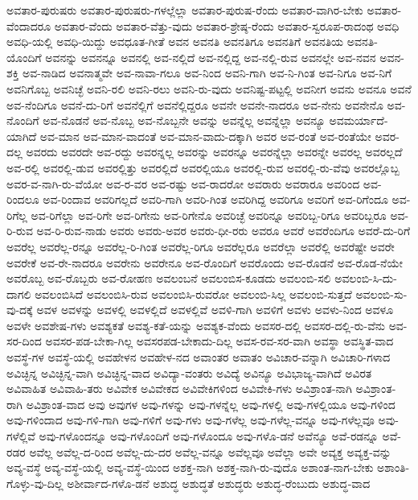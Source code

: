 {ಅವತಾರ-ಪುರುಷರು
ಅವತಾರ-ಪುರುಷರು-ಗಳಲ್ಲೆಲ್ಲಾ
ಅವತಾರ-ಪುರುಷ-ರೆಂದು
ಅವತಾರ-ವಾಗಿರ-ಬೇಕು
ಅವತಾರ-ವೆಂದಾದರೂ
ಅವತಾರ-ವೆಂದು
ಅವತಾರ-ವೆತ್ತು-ವುದು
ಅವತಾರ-ಶ್ರೇಷ್ಠ-ರೆಂದು
ಅವತಾರ-ಸ್ವರೂಪ-ರಾದಂಥ
ಅವಧಿ
ಅವಧಿ-ಯಲ್ಲಿ
ಅವಧಿ-ಯಿದ್ದು
ಅವಧೂತ-ಗೀತೆ
ಅವನ
ಅವನತಿ
ಅವನತಿಗೂ
ಅವನತಿಗೆ
ಅವನತಿಯ
ಅವನತಿ-ಯೊಂದಿಗೆ
ಅವನನ್ನು
ಅವನನ್ನೂ
ಅವನಲ್ಲಿ
ಅವ-ನಲ್ಲಿದೆ
ಅವ-ನಲ್ಲಿದ್ದ
ಅವ-ನಲ್ಲಿ-ರುವ
ಅವನಲ್ಲೇ
ಅವ-ನವನ
ಅವನ-ಶಕ್ತಿ
ಅವ-ನಾಡಿದ
ಅವನಾತ್ಮವೇ
ಅವ-ನಾವಾ-ಗಲೂ
ಅವ-ನಿಂದ
ಅವನಿ-ಗಾಗಿ
ಅವ-ನಿ-ಗಿಂತ
ಅವ-ನಿಗೂ
ಅವ-ನಿಗೆ
ಅವನಿಗೊಬ್ಬ
ಅವನಿಚ್ಛೆ
ಅವನಿ-ರಲಿ
ಅವನಿ-ರಲು
ಅವನಿ-ರು-ವುದು
ಅವನಿಷ್ಟ-ಪಟ್ಟಲ್ಲಿ
ಅವನೀಗ
ಅವನು
ಅವನೂ
ಅವನೆ
ಅವ-ನೆಂದಿಗೂ
ಅವನೆ-ದು-ರಿಗೆ
ಅವನೆಲ್ಲಿಗೆ
ಅವನೆಲ್ಲಿದ್ದರೂ
ಅವನೇ
ಅವನೇ-ನಾದರೂ
ಅವ-ನೇನು
ಅವನೇನೊ
ಅವ-ನೊಂದಿಗೆ
ಅವ-ನೊಡನೆ
ಅವ-ನೊಬ್ಬ
ಅವ-ನೊಬ್ಬನೇ
ಅವನ್ನು
ಅವನ್ನೆಲ್ಲ
ಅವನ್ನೆಲ್ಲಾ
ಅವನ್ಯೂ
ಅವಮರ್ಯಾದೆ-ಯಾಗಿದೆ
ಅವ-ಮಾನ
ಅವ-ಮಾನ-ವಾದಂತೆ
ಅವ-ಮಾನ-ವಾದು-ದಕ್ಕಾಗಿ
ಅವರ
ಅವ-ರಂತೆ
ಅವ-ರಂತೆಯೇ
ಅವರ-ದಲ್ಲ
ಅವರದು
ಅವರದೇ
ಅವ-ರದ್ದು
ಅವರನ್ನಲ್ಲ
ಅವರನ್ನು
ಅವರನ್ನೂ
ಅವರನ್ನೆಲ್ಲಾ
ಅವರನ್ನೇ
ಅವರಲ್ಲ
ಅವರಲ್ಲದೆ
ಅವ-ರಲ್ಲಿ
ಅವರಲ್ಲಿ-ಡುವ
ಅವರಲ್ಲಿತ್ತು
ಅವರಲ್ಲಿದೆ
ಅವರಲ್ಲಿಯೂ
ಅವರಲ್ಲಿ-ರುವ
ಅವರಲ್ಲಿ-ರು-ವೆವು
ಅವರಲ್ಲೊಬ್ಬ
ಅವರ-ವ-ನಾಗಿ-ರು-ವೆಯೋ
ಅವ-ರ-ವರ
ಅವ-ರಷ್ಟು
ಅವ-ರಾದರೋ
ಅವರಾರು
ಅವರಾರೂ
ಅವರಿಂದ
ಅವ-ರಿಂದಲೂ
ಅವ-ರಿಂದಾವ
ಅವರಿಗಲ್ಲದೆ
ಅವರಿ-ಗಾಗಿ
ಅವರಿ-ಗಿಂತ
ಅವರಿಗಿದ್ದ
ಅವರಿಗೂ
ಅವರಿಗೆ
ಅವ-ರಿಗೆಂದೂ
ಅವ-ರಿಗೆಲ್ಲ
ಅವ-ರಿಗೆಲ್ಲಾ
ಅವ-ರಿಗೇ
ಅವ-ರಿಗೇನು
ಅವ-ರಿಗೇನೊ
ಅವರಿಚ್ಛೆ
ಅವರಿನ್ನೂ
ಅವರಿಬ್ಬ-ರಿಗೂ
ಅವರಿಬ್ಬರೂ
ಅವ-ರಿ-ರುವ
ಅವ-ರಿ-ರುವ-ನಾಡು
ಅವರು
ಅವರು-ಅವರ
ಅವರು-ಧೀ-ರರು
ಅವರೂ
ಅವರೆ
ಅವರೆಂದಿಗೂ
ಅವರೆ-ದು-ರಿಗೆ
ಅವರೆಲ್ಲ
ಅವರೆಲ್ಲ-ರನ್ನೂ
ಅವರೆಲ್ಲ-ರಿ-ಗಿಂತ
ಅವರೆಲ್ಲ-ರಿಗೂ
ಅವರೆಲ್ಲರೂ
ಅವರೆಲ್ಲಾ
ಅವರೆಲ್ಲಿ
ಅವರೆಷ್ಟೇ
ಅವರೇ
ಅವರೇಕೆ
ಅವ-ರೇ-ನಾದರೂ
ಅವರೇನು
ಅವರೇನೂ
ಅವ-ರೊಂದಿಗೆ
ಅವರೊಂದು
ಅವ-ರೊಡನೆ
ಅವ-ರೊಡ-ನೆಯೇ
ಅವರೊಬ್ಬ
ಅವ-ರೊಬ್ಬರು
ಅವ-ರೋಹಣ
ಅವಲಂಬನೆ
ಅವಲಂಬಿಸ-ಕೂಡದು
ಅವಲಂಬಿ-ಸಲಿ
ಅವಲಂಬಿ-ಸಿ-ದು-ದಾಗಲಿ
ಅವಲಂಬಿಸಿದೆ
ಅವಲಂಬಿಸಿ-ರುವ
ಅವಲಂಬಿಸಿ-ರುವರೋ
ಅವಲಂಬಿ-ಸಿಲ್ಲ
ಅವಲಂಬಿ-ಸುತ್ತದೆ
ಅವಲಂಬಿ-ಸು-ವು-ದಕ್ಕೆ
ಅವಳ
ಅವಳನ್ನು
ಅವಳಲ್ಲಿ
ಅವಳಲ್ಲಿದೆ
ಅವಳಲ್ಲಿವೆ
ಅವಳಿ-ಗಾಗಿ
ಅವಳಿಗೆ
ಅವಳು
ಅವಳು-ನಿಂದ
ಅವಳೂ
ಅವಳೇ
ಅವಶೇಷ-ಗಳು
ಅವಶ್ಯಕತೆ
ಅವಶ್ಯ-ಕತೆ-ಯನ್ನು
ಅವಶ್ಯಕ-ವೆಂದು
ಅವಸರ-ದಲ್ಲಿ
ಅವಸರ-ದಲ್ಲಿ-ರು-ವೆನು
ಅವ-ಸರ-ದಿಂದ
ಅವಸರ-ಪಡ-ಬೇಕಾ-ಗಿಲ್ಲ
ಅವಸರಪಡ-ಬೇಕಾದು-ದಿಲ್ಲ
ಅವಸ-ರವ-ಸರ-ವಾಗಿ
ಅವಸ್ಥಾ
ಅವಸ್ಥಿತ-ವಾದ
ಅವಸ್ಥೆ-ಗಳ
ಅವಸ್ಥೆ-ಯಲ್ಲಿ
ಅವಹೇಳನ
ಅವಹೇಳ-ನದ
ಅವಾಂತರ
ಅವಾತಂ
ಅವಿಚಾರ-ವನ್ನಾಗಿ
ಅವಿಚಾರಿ-ಗಳಾದ
ಅವಿಚ್ಛಿನ್ನ
ಅವಿಚ್ಛಿನ್ನ-ವಾಗಿ
ಅವಿಚ್ಛಿನ್ನ-ವಾದ
ಅವಿದ್ಯಾ-ವಂತರು
ಅವಿದ್ಯೆ
ಅವಿನ್ಯೂ
ಅವಿಭಾಜ್ಯ-ವಾಗಿದೆ
ಅವಿರತ
ಅವಿವಾಹಿತ
ಅವಿವಾಹಿ-ತರು
ಅವಿವೇಕ
ಅವಿವೇಕದ
ಅವಿವೇಕಿಗಳಿಂದ
ಅವಿವೇಕಿ-ಗಳು
ಅವಿಶ್ರಾಂತ-ನಾಗಿ
ಅವಿಶ್ರಾಂತ-ರಾಗಿ
ಅವಿಶ್ರಾಂತ-ವಾದ
ಅವು
ಅವುಗಳ
ಅವು-ಗಳನ್ನು
ಅವು-ಗಳನ್ನೆಲ್ಲ
ಅವು-ಗಳಲ್ಲಿ
ಅವು-ಗಳಲ್ಲಿಯೂ
ಅವು-ಗಳಿಂದ
ಅವು-ಗಳಿಂದಾದ
ಅವು-ಗಳಿ-ಗಾಗಿ
ಅವು-ಗಳಿಗೆ
ಅವು-ಗಳು
ಅವು-ಗಳೆಲ್ಲ
ಅವು-ಗಳೆಲ್ಲ-ವನ್ನೂ
ಅವು-ಗಳೆಲ್ಲವೂ
ಅವು-ಗಳೆಲ್ಲಿವೆ
ಅವು-ಗಳೊಂದನ್ನೂ
ಅವು-ಗಳೊಂದಿಗೆ
ಅವು-ಗಳೊಂದೂ
ಅವು-ಗಳೊ-ಡನೆ
ಅವೆನ್ಯೂ
ಅವೆ-ರಡನ್ನೂ
ಅವೆ-ರಡರ
ಅವೆಲ್ಲ
ಅವೆಲ್ಲ-ದ-ರಿಂದ
ಅವೆಲ್ಲ-ದು-ದರ
ಅವೆಲ್ಲ-ವನ್ನೂ
ಅವೆಲ್ಲವೂ
ಅವೆಲ್ಲಾ
ಅವೇ
ಅವ್ಯಕ್ತ
ಅವ್ಯಕ್ತ-ವನ್ನು
ಅವ್ಯ-ವಸ್ಥೆ
ಅವ್ಯ-ವಸ್ಥೆ-ಯಲ್ಲಿ
ಅವ್ಯ-ವಸ್ಥೆ-ಯಿಂದ
ಅಶಕ್ತ-ನಾಗಿ
ಅಶಕ್ತ-ನಾಗಿ-ರು-ವುದೊ
ಅಶಾಂತ-ನಾಗ-ಬೇಕು
ಅಶಾಂತಿ-ಗೊಳ್ಳು-ವು-ದಿಲ್ಲ
ಅಶೀರ್ವಾದ-ಗಳೊ-ಡನೆ
ಅಶುದ್ಧ
ಅಶುದ್ಧತೆ
ಅಶುದ್ಧರು
ಅಶುದ್ಧ-ರೆಂಬುದು
ಅಶುದ್ಧ-ವಾದ
}
